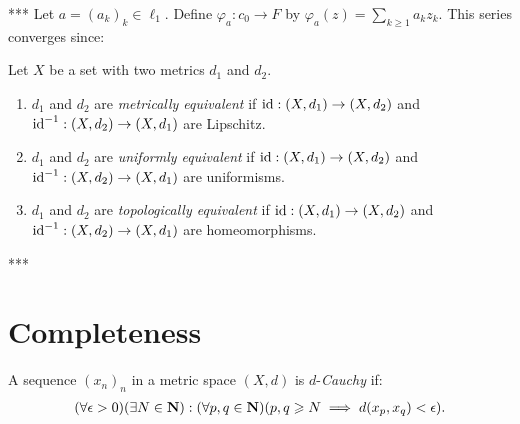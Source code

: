     \begin{example}***
        Let $a = (a_k)_k \in \ell_1$. Define $\varphi_a:c_0 \rightarrow F$ by $\varphi_a(z) = \sum_{k \geq 1}a_k z_k$. This series converges since:
    \end{example}

    \begin{definition}
        Let $X$ be a set with two metrics $d_1$ and $d_2$.
        \begin{enumerate}[label = (\arabic*),itemsep=1pt,topsep=3pt]
            \item $d_1$ and $d_2$ are \textit{metrically equivalent} if $\operatorname{id}:(X,d_1) \rightarrow (X,d_2)$ and $\operatorname{id}^{-1}:(X,d_2) \rightarrow (X,d_1)$ are Lipschitz.
            \item $d_1$ and $d_2$ are \textit{uniformly equivalent} if $\operatorname{id}:(X,d_1) \rightarrow (X,d_2)$ and $\operatorname{id}^{-1}:(X,d_2) \rightarrow (X,d_1)$ are uniformisms.
            \item $d_1$ and $d_2$ are \textit{topologically equivalent} if $\operatorname{id}:(X,d_1) \rightarrow (X,d_2)$ and $\operatorname{id}^{-1}:(X,d_2) \rightarrow (X,d_1)$ are homeomorphisms.
        \end{enumerate}
    \end{definition}

    \begin{example}***
        
    \end{example}

\section{Completeness}\label{sec:completeness}
    \begin{definition}
        A sequence $(x_n)_n$ in a metric space $(X,d)$ is $d$-\textit{Cauchy} if:
            \begin{equation*}
            \begin{split}
                (\forall \epsilon > 0)(\exists N \in \mathbf{N}): (\forall p,q \in \mathbf{N})(p,q \geqslant N \implies d(x_p,x_q) < \epsilon).
            \end{split}
            \end{equation*}
    \end{definition}

